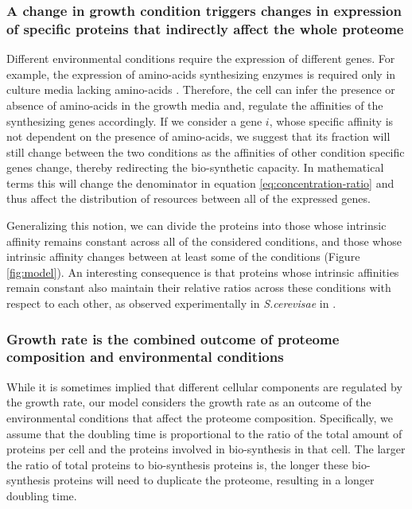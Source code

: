 \documentclass{article}
\begin{document}
\subsubsection{A change in growth condition triggers changes in expression of specific proteins that indirectly affect the whole proteome}
Different environmental conditions require the expression of different genes.
For example, the expression of amino-acids synthesizing enzymes is required only in culture media lacking amino-acids \cite{24656150,10515934}.
Therefore, the cell can infer the presence or absence of amino-acids in the growth media and, regulate the affinities of the synthesizing genes accordingly.
If we consider a gene $i$, whose specific affinity is not dependent on the presence of amino-acids, we suggest that its fraction will still change between the two conditions as the affinities of other condition specific genes change, thereby redirecting the bio-synthetic capacity.
In mathematical terms this will change the denominator in equation \ref{eq:concentration-ratio} and thus affect the distribution of resources between all of the expressed genes.


Generalizing this notion, we can divide the proteins into those whose intrinsic affinity remains constant across all of the considered conditions, and those whose intrinsic affinity changes between at least some of the conditions (Figure \ref{fig:model}).
An interesting consequence is that proteins whose intrinsic affinities remain constant also maintain their relative ratios across these conditions with respect to each other, as observed experimentally in \emph{S.cerevisae} in \cite{Keren2013}.

\subsubsection{Growth rate is the combined outcome of proteome composition and environmental conditions}
While it is sometimes implied that different cellular components are regulated by the growth rate, our model considers the growth rate as an outcome of the environmental conditions that affect the proteome composition.
Specifically, we assume that the doubling time is proportional to the ratio of the total amount of proteins per cell and the proteins involved in bio-synthesis in that cell.
The larger the ratio of total proteins to bio-synthesis proteins is, the longer these bio-synthesis proteins will need to duplicate the proteome, resulting in a longer doubling time.
\end{document}
